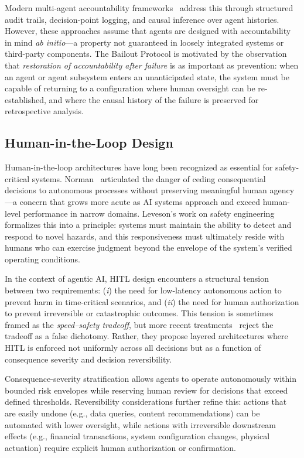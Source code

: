 Modern multi-agent accountability frameworks~\cite{bansal2019} address this through structured audit trails, decision-point logging, and causal inference over agent histories. However, these approaches assume that agents are designed with accountability in mind \emph{ab initio}---a property not guaranteed in loosely integrated systems or third-party components. The Bailout Protocol is motivated by the observation that \emph{restoration of accountability after failure} is as important as prevention: when an agent or agent subsystem enters an unanticipated state, the system must be capable of returning to a configuration where human oversight can be re-established, and where the causal history of the failure is preserved for retrospective analysis.

\subsection{Human-in-the-Loop Design}

Human-in-the-loop architectures have long been recognized as essential for safety-critical systems. Norman~\cite{wiener1948} articulated the danger of ceding consequential decisions to autonomous processes without preserving meaningful human agency---a concern that grows more acute as AI systems approach and exceed human-level performance in narrow domains. Leveson's work on safety engineering formalizes this into a principle: systems must maintain the ability to detect and respond to novel hazards, and this responsiveness must ultimately reside with humans who can exercise judgment beyond the envelope of the system's verified operating conditions.

In the context of agentic AI, HITL design encounters a structural tension between two requirements: (\emph{i}) the need for low-latency autonomous action to prevent harm in time-critical scenarios, and (\emph{ii}) the need for human authorization to prevent irreversible or catastrophic outcomes. This tension is sometimes framed as the \emph{speed--safety tradeoff}, but more recent treatments~\cite{bansal2019} reject the tradeoff as a false dichotomy. Rather, they propose layered architectures where HITL is enforced not uniformly across all decisions but as a function of consequence severity and decision reversibility.

Consequence-severity stratification allows agents to operate autonomously within bounded risk envelopes while reserving human review for decisions that exceed defined thresholds. Reversibility considerations further refine this: actions that are easily undone (e.g., data queries, content recommendations) can be automated with lower oversight, while actions with irreversible downstream effects (e.g., financial transactions, system configuration changes, physical actuation) require explicit human authorization or confirmation.

